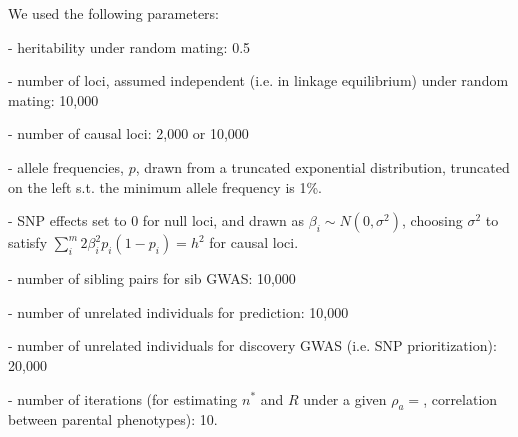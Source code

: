 \documentclass[hidelinks, 12pt]{article}
\begin{document}
We used the following parameters:

- heritability under random mating: 0.5

- number of loci, assumed independent (i.e. in linkage equilibrium) under random mating: 10,000

- number of causal loci: 2,000 or 10,000

- allele frequencies, $p$, drawn from a truncated exponential distribution, truncated on the left s.t. the minimum allele frequency is 1\%.

- SNP effects set to 0 for null loci, and drawn as $\beta_i\sim N(0,\sigma^2)$, choosing $\sigma^2$ to satisfy $\sum_i^m2\beta_i^2p_i(1-p_i)=h^2$ for causal loci. 

- number of sibling pairs for sib GWAS: 10,000

- number of unrelated individuals for prediction: 10,000

- number of unrelated individuals for discovery GWAS (i.e. SNP prioritization): 20,000

- number of iterations (for estimating $n^*$ and $R$ under a given $\rho_a=$, correlation between parental phenotypes): 10.

\pagebreak
\end{document}
